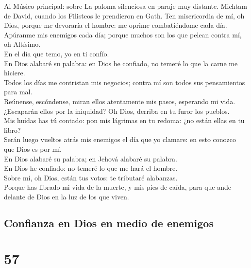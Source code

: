  Al Músico principal: sobre La paloma silenciosa en paraje
muy distante. Michtam de David, cuando los Filisteos le prendieron en
Gath. Ten misericordia de mí, oh Dios, porque me devoraría el hombre: me
oprime combatiéndome cada día.\\
 Apúranme mis enemigos cada día; porque muchos son los que
pelean contra mí, oh Altísimo.\\
 En el día que temo, yo en ti confío.\\
 En Dios alabaré su palabra: en Dios he confiado, no
temeré lo que la carne me hiciere.\\
 Todos los días me contristan mis negocios; contra mí son
todos sus pensamientos para mal.\\
 Reúnense, escóndense, miran ellos atentamente mis pasos,
esperando mi vida.\\
 ¿Escaparán ellos por la iniquidad? Oh Dios, derriba en tu
furor los pueblos.\\
 Mis huídas has tú contado: pon mis lágrimas en tu redoma:
¿no están ellas en tu libro?\\
 Serán luego vueltos atrás mis enemigos el día que yo
clamare: en esto conozco que Dios es por mí.\\
 En Dios alabaré su palabra; en Jehová alabaré su
palabra.\\
 En Dios he confiado: no temeré lo que me hará el
hombre.\\
 Sobre mí, oh Dios, están tus votos: te tributaré
alabanzas.\\
 Porque has librado mi vida de la muerte, y mis pies de
caída, para que ande delante de Dios en la luz de los que viven.

\hypertarget{confianza-en-dios-en-medio-de-enemigos}{%
\subsection{Confianza en Dios en medio de
enemigos}\label{confianza-en-dios-en-medio-de-enemigos}}

\hypertarget{section-19-57}{%
\section{57}\label{section-19-57}}

